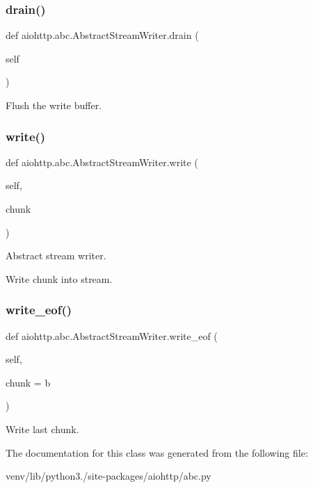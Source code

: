 \subsubsection{\texorpdfstring{drain()}{drain()}}
{\footnotesize\ttfamily def aiohttp.\+abc.\+Abstract\+Stream\+Writer.\+drain (\begin{DoxyParamCaption}\item[{}]{self }\end{DoxyParamCaption})}

\begin{DoxyVerb}Flush the write buffer.\end{DoxyVerb}
 \mbox{\label{classaiohttp_1_1abc_1_1_abstract_stream_writer_a0ba5212f240284f71d8beedf19eb899b}} 
\subsubsection{\texorpdfstring{write()}{write()}}
{\footnotesize\ttfamily def aiohttp.\+abc.\+Abstract\+Stream\+Writer.\+write (\begin{DoxyParamCaption}\item[{}]{self,  }\item[{}]{chunk }\end{DoxyParamCaption})}

\begin{DoxyVerb}Abstract stream writer.\end{DoxyVerb}
\begin{DoxyVerb}Write chunk into stream.\end{DoxyVerb}
 \mbox{\label{classaiohttp_1_1abc_1_1_abstract_stream_writer_a79e207de683e88eabaf5e4a0dd357fcb}} 
\subsubsection{\texorpdfstring{write\+\_\+eof()}{write\_eof()}}
{\footnotesize\ttfamily def aiohttp.\+abc.\+Abstract\+Stream\+Writer.\+write\+\_\+eof (\begin{DoxyParamCaption}\item[{}]{self,  }\item[{}]{chunk = {\ttfamily b\textquotesingle{}\textquotesingle{}} }\end{DoxyParamCaption})}

\begin{DoxyVerb}Write last chunk.\end{DoxyVerb}
 

The documentation for this class was generated from the following file\+:\begin{DoxyCompactItemize}
\item 
venv/lib/python3./site-\/packages/aiohttp/abc.\+py\end{DoxyCompactItemize}
